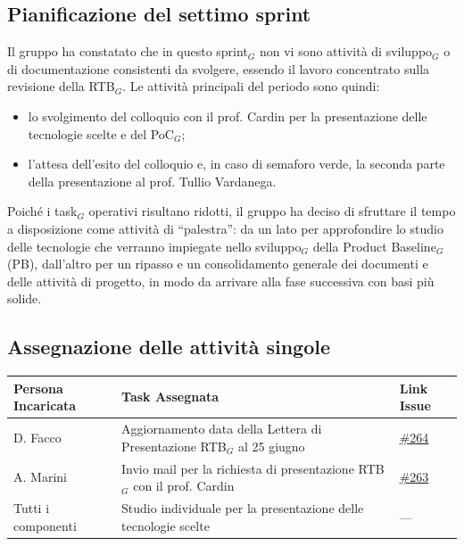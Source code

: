 \documentclass[a4paper, 10pt, colorlinks=true, linkcolor=black, urlcolor=blue, citecolor=blue, hidelinks]{article}
\newcommand{\issue}[1]{\href{https://github.com/thebitless-group-swe/thebitless.github.io/issues/#1}{\##1}}
\begin{document}
\subsection{Pianificazione del settimo sprint}
Il gruppo ha constatato che in questo sprint$_G$ non vi sono attività di sviluppo$_G$ o di documentazione consistenti da svolgere, essendo il lavoro concentrato sulla revisione della RTB$_G$. Le attività principali del periodo sono quindi:
\begin{itemize}
    \item lo svolgimento del colloquio con il prof. Cardin per la presentazione delle tecnologie scelte e del PoC$_G$;
    \item l'attesa dell'esito del colloquio e, in caso di semaforo verde, la seconda parte della presentazione al prof. Tullio Vardanega.
\end{itemize}
Poiché i task$_G$ operativi risultano ridotti, il gruppo ha deciso di sfruttare il tempo a disposizione come attività di ``palestra'': da un lato per approfondire lo studio delle tecnologie che verranno impiegate nello sviluppo$_G$ della Product Baseline$_G$ (PB), dall'altro per un ripasso e un consolidamento generale dei documenti e delle attività di progetto, in modo da arrivare alla fase successiva con basi più solide.

\subsection{Assegnazione delle attività singole}
\begin{center}
    \renewcommand{\arraystretch}{1.4}
        \begin{tabular}{|p{4.2cm}|p{6.2cm}|p{2.2cm}|}
        \hline
        \textbf{Persona Incaricata} & \textbf{Task Assegnata} & \centering\textbf{Link Issue} \tabularnewline
        \hline
        D. Facco & Aggiornamento data della Lettera di Presentazione RTB$_G$ al 25 giugno & \issue{264} \\
        \hline
        A. Marini & Invio mail per la richiesta di presentazione RTB$_G$ con il prof. Cardin & \issue{263} \\
        \hline
        Tutti i componenti & Studio individuale per la presentazione delle tecnologie scelte & --- \\
        \hline
    \end{tabular}
\end{center}

\appendix
\end{document}

